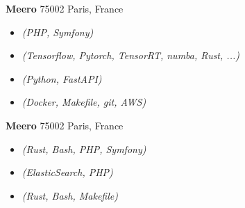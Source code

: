 \documentclass[a4paper]{article}
\newcommand\en[1]{}
\newcommand\fr[1]{}
\begin{document}
    \textbf{Meero}
        \hfill 75002 Paris, France\\
        \en{ \textit{"Backend programmer"} \hfill March 2020 - June 2020\\}
        \fr{ \textit{"Développeur backend"} \hfill mars 2020 - juin 2020\\}
        \vspace{-1mm}
        \begin{itemize} \itemsep 1pt
            \item
                \en{reation of unit \& functional tests for the Meero platform}
                \fr{Écriture de tests unitaires \& fonctionnels pour la plateform Meero}
                {\sl (PHP, Symfony)}
            \item
                \en{Optimization \& integration of the algorithms written by the R\&D team into a micro-services environment}
                \fr{Optimisation et intégration d’algorithmes écrits par la R\&D dans un système de micro-services}
                {\sl (Tensorflow, Pytorch, TensorRT, numba, Rust, ...)}
            \item
                \en{Work on a custom step machine to orchestrate our micro-services}
                \fr{Travail sur une step-machine pour gérer les micro-services}
                {\sl (Python, FastAPI)}
            \item
                \en{Creation of an intuitive and efficient workflow for the R\&D team}
                \fr{Création et mise en place d’un workflow intuitif et efficace pour la R\&D}
                {\sl (Docker, Makefile, git, AWS)}
        \end{itemize}


    \textbf{Meero}
        \hfill 75002 Paris, France\\
        \en{ \textit{Backend programmer} \hfill September 2019 - February 2020\\}
        \fr{ \textit{Développeur backend} \hfill septembre 2019 - février 2020\\}
        \vspace{-1mm}
        \begin{itemize} \itemsep 1pt
            \item
                \en{Symfony 3 to 4 migration on a project in consant evolution}
                \fr{Migration Symfony 3 à 4 sur un projet en rapide évolution}
                {\sl (Rust, Bash, PHP, Symfony)}
            \item
                \en{Finalization of the matching algo between photographers \& shoots}
                \fr{Finalisation de l'algo de matching entre photographes \& shoots}
                {\sl (ElasticSearch, PHP)}
            \item
                \en{Scripts to aid maintenance on the big PHP monolith}
                \fr{Création de scripts aidants à maintenir le gors monolithe PHP}
                {\sl (Rust, Bash, Makefile)}
        \end{itemize}
\end{document}
